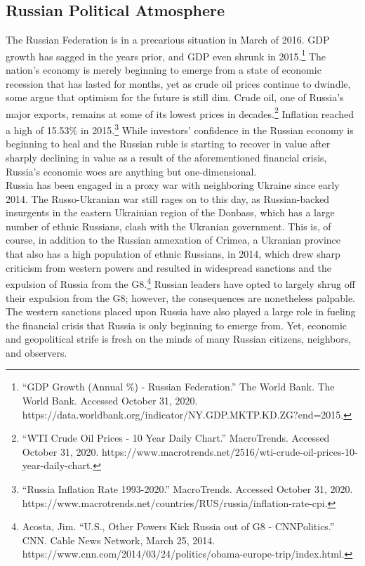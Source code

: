 \documentclass[10pt, letterpaper]{article}
\begin{document}
\subsection{Russian Political Atmosphere}

The Russian Federation is in a precarious situation in March of 2016.
GDP growth has sagged in the years prior, and GDP even shrunk in
2015.\footnote{``GDP Growth (Annual \%) - Russian Federation.'' The
  World Bank. The World Bank. Accessed October 31, 2020.
  https://data.worldbank.org/indicator/NY.GDP.MKTP.KD.ZG?end=2015.} The
nation's economy is merely beginning to emerge from a state of economic
recession that has lasted for months, yet as crude oil prices continue
to dwindle, some argue that optimism for the future is still dim. Crude
oil, one of Russia's major exports, remains at some of its lowest prices
in decades.\footnote{``WTI Crude Oil Prices - 10 Year Daily Chart.''
  MacroTrends. Accessed October 31, 2020.
  https://www.macrotrends.net/2516/wti-crude-oil-prices-10-year-daily-chart.}
Inflation reached a high of 15.53\% in 2015.\footnote{``Russia Inflation
  Rate 1993-2020.'' MacroTrends. Accessed October 31, 2020.
  https://www.macrotrends.net/countries/RUS/russia/inflation-rate-cpi.}
While investors' confidence in the Russian economy is beginning to heal
and the Russian ruble is starting to recover in value after sharply
declining in value as a result of the aforementioned financial crisis,
Russia's economic woes are anything but one-dimensional. \\

Russia has been engaged in a proxy war with neighboring Ukraine since
early 2014. The Russo-Ukranian war still rages on to this day, as
Russian-backed insurgents in the eastern Ukrainian region of the
Donbass, which has a large number of ethnic Russians, clash with the
Ukranian government. This is, of course, in addition to the Russian
annexation of Crimea, a Ukranian province that also has a high
population of ethnic Russians, in 2014, which drew sharp criticism from
western powers and resulted in widespread sanctions and the expulsion of
Russia from the G8.\footnote{Acosta, Jim. ``U.S., Other Powers Kick
  Russia out of G8 - CNNPolitics.'' CNN. Cable News Network, March 25,
  2014.
  https://www.cnn.com/2014/03/24/politics/obama-europe-trip/index.html.}
Russian leaders have opted to largely shrug off their expulsion from the
G8; however, the consequences are nonetheless palpable. The western
sanctions placed upon Russia have also played a large role in fueling
the financial crisis that Russia is only beginning to emerge from. Yet,
economic and geopolitical strife is fresh on the minds of many Russian
citizens, neighbors, and observers. \\
\end{document}
